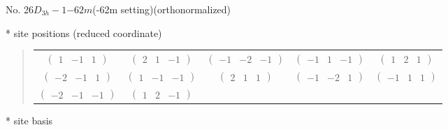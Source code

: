 \documentclass[fleqn,9pt,landscape]{jsarticle}
\begin{document}
\newpage
\begin{center}
\LARGE
No. 26\quad$D_{3h}-1$\quad$-62m$\quad(-62m setting)\quad[ hexagonal ] (orthonormalized)
\end{center}
\vspace{5mm}
* site positions (reduced coordinate)
\begin{quote}
\begin{tabular}{ccccc}
$ \begin{pmatrix} 1 & -1 & 1 \end{pmatrix} $ & $ \begin{pmatrix} 2 & 1 & -1 \end{pmatrix} $ & $ \begin{pmatrix} -1 & -2 & -1 \end{pmatrix} $ & $ \begin{pmatrix} -1 & 1 & -1 \end{pmatrix} $ & $ \begin{pmatrix} 1 & 2 & 1 \end{pmatrix} $ \\
$ \begin{pmatrix} -2 & -1 & 1 \end{pmatrix} $ & $ \begin{pmatrix} 1 & -1 & -1 \end{pmatrix} $ & $ \begin{pmatrix} 2 & 1 & 1 \end{pmatrix} $ & $ \begin{pmatrix} -1 & -2 & 1 \end{pmatrix} $ & $ \begin{pmatrix} -1 & 1 & 1 \end{pmatrix} $ \\
$ \begin{pmatrix} -2 & -1 & -1 \end{pmatrix} $ & $ \begin{pmatrix} 1 & 2 & -1 \end{pmatrix} $ & $  $ & $  $ & $  $
\end{tabular}
\end{quote}
* site basis
\end{document}
